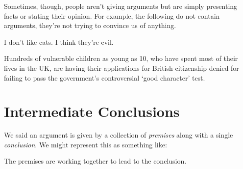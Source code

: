 Sometimes, though, people aren't giving arguments but are simply presenting facts or stating their opinion.
For example, the following do not contain arguments, they're not trying to convince us of anything.
\begin{ebullet}
\item I don't like cats. I think they're evil.
\item Hundreds of vulnerable children as young as 10, who have spent most of their lives in the UK, are having their applications for British citizenship denied for failing to pass the government's controversial `good character' test.
\end{ebullet}


\section{Intermediate Conclusions}
%

We said an argument is given by a collection of \emph{premises} along with a single \emph{conclusion}.
We might represent this as something like:
\begin{center}

\end{center}
The premises are working together to lead to the conclusion.


